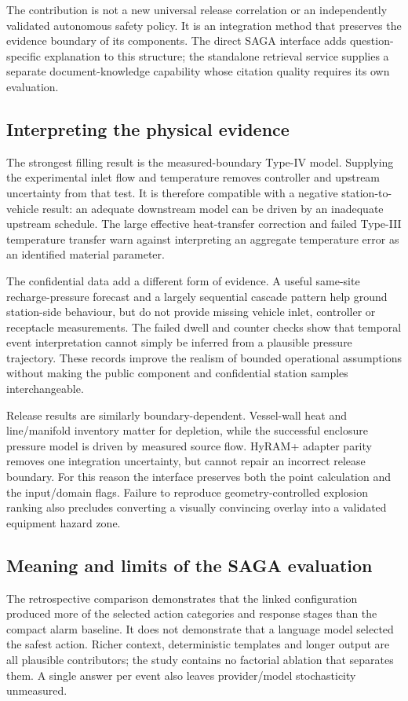 \documentclass[12pt,a4paper]{article}
\begin{document}
The contribution is not a new universal release correlation or an independently
validated autonomous safety policy. It is an integration method that preserves
the evidence boundary of its components. The direct SAGA interface adds
question-specific explanation to this structure; the standalone retrieval
service supplies a separate document-knowledge capability whose citation
quality requires its own evaluation.

\subsection{Interpreting the physical evidence}
The strongest filling result is the measured-boundary Type-IV model. Supplying
the experimental inlet flow and temperature removes controller and upstream
uncertainty from that test. It is therefore compatible with a negative
station-to-vehicle result: an adequate downstream model can be driven by an
inadequate upstream schedule. The large effective heat-transfer correction and
failed Type-III temperature transfer warn against interpreting an aggregate
temperature error as an identified material parameter.

The confidential data add a different form of evidence. A useful same-site
recharge-pressure forecast and a largely sequential cascade pattern help
ground station-side behaviour, but do not provide missing vehicle inlet,
controller or receptacle measurements. The failed dwell and counter checks
show that temporal event interpretation cannot simply be inferred from a
plausible pressure trajectory. These records improve the realism of bounded
operational assumptions without making the public component and confidential
station samples interchangeable.

Release results are similarly boundary-dependent. Vessel-wall heat and
line/manifold inventory matter for depletion, while the successful enclosure
pressure model is driven by measured source flow. HyRAM+ adapter parity removes
one integration uncertainty, but cannot repair an incorrect release boundary.
For this reason the interface preserves both the point calculation and the
input/domain flags. Failure to reproduce geometry-controlled explosion ranking
also precludes converting a visually convincing overlay into a validated
equipment hazard zone.

\subsection{Meaning and limits of the SAGA evaluation}
The retrospective comparison demonstrates that the linked configuration
produced more of the selected action categories and response stages than the
compact alarm baseline. It does not demonstrate that a language model selected
the safest action. Richer context, deterministic templates and longer output
are all plausible contributors; the study contains no factorial ablation that
separates them. A single answer per event also leaves provider/model
stochasticity unmeasured.
\end{document}
